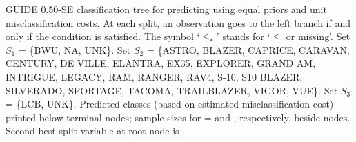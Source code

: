 \documentclass{article}
\begin{document}
 \begin{center}
 \end{center}
GUIDE  0.50-SE classification tree for predicting \texttt{} using
 equal priors
 and unit misclassification costs.
At each split, an observation goes to the left branch 
 if and only if the condition is satisfied.
 The symbol `$\leq_*$' stands for `$\leq$ or missing'.
Set $S_{1}$ = \{BWU, NA, UNK\}.
Set $S_{2}$ = \{ASTRO, BLAZER, CAPRICE, CARAVAN, CENTURY, DE VILLE, ELANTRA,
 EX35, EXPLORER, GRAND AM, INTRIGUE, LEGACY, RAM, RANGER, RAV4, S-10,
 S10 BLAZER, SILVERADO, SPORTAGE, TACOMA, TRAILBLAZER, VIGOR, VUE\}.
Set $S_{3}$ = \{LCB, UNK\}.
Predicted classes (based on estimated misclassification cost)
printed below terminal nodes;
 sample sizes for \texttt{} =
 \texttt{} and \texttt{}, respectively, beside nodes.
Second best split variable at root node is \texttt{}.
 
\end{document}
